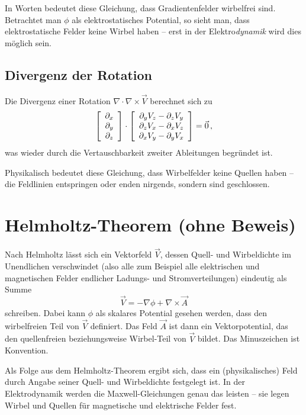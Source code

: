 \documentclass[paper=a4, fontsize=11.0pt, abstractoff, DIV12]{scrartcl}
\begin{document}
In Worten bedeutet diese Gleichung, dass Gradientenfelder wirbelfrei sind.
Betrachtet man $\phi$ als elektrostatisches Potential, so sieht man, dass
elektrostatische Felder keine Wirbel haben -- erst in der Elektro\emph{dynamik}
wird dies möglich sein.

\subsection{Divergenz der Rotation}

Die Divergenz einer Rotation $\nabla\cdot\nabla\times\vec V$ berechnet sich
zu
\begin{align}
\DreierVec{\partial_x}{\partial_y}{\partial_z}\cdot\DreierVec{\partial_yV_z-\partial_zV_y}{\partial_zV_x-\partial_xV_z}{\partial_xV_y-\partial_yV_x}
= \vec 0\,,
\end{align}
was wieder durch die Vertauschbarkeit zweiter Ableitungen begründet ist.

Physikalisch bedeutet diese Gleichung, dass Wirbelfelder keine Quellen haben --
die Feldlinien entspringen oder enden nirgends, sondern sind geschlossen.

\section{Helmholtz-Theorem (ohne Beweis)}

Nach Helmholtz lässt sich ein Vektorfeld $\vec V$, dessen Quell- und
Wirbeldichte im Unendlichen verschwindet (also alle zum Beispiel alle
elektrischen und magnetischen Felder endlicher Ladungs- und
Stromverteilungen) eindeutig als Summe
\begin{equation}
\vec V = -\nabla \phi + \nabla \times \vec A
\end{equation}
schreiben. Dabei kann $\phi$ als skalares Potential gesehen werden, dass den
wirbelfreien Teil von $\vec V$ definiert. Das Feld $\vec A$ ist dann ein
Vektorpotential, das den quellenfreien beziehungsweise Wirbel-Teil von $\vec
V$ bildet. Das Minuszeichen ist Konvention.

Als Folge aus dem Helmholtz-Theorem ergibt sich, dass ein (physikalisches) Feld
durch Angabe seiner Quell- und Wirbeldichte festgelegt ist. In der Elektrodynamik
werden die Maxwell-Gleichungen genau das leisten -- sie legen Wirbel und Quellen
für magnetische und elektrische Felder fest.
\nocite{*}




\end{document}
